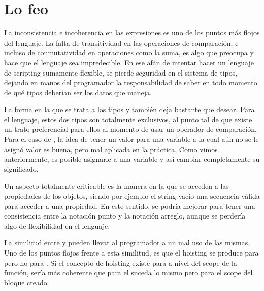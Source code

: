 \section*{Lo feo}

La inconsistencia e incoherencia en las expresiones es uno de los puntos más flojos del lenguaje. La falta de transitividad en las operaciones de comparación, e incluso de conmutatividad en operaciones como la suma, es algo que preocupa y hace que el lenguaje sea impredecible. En ese afán de intentar hacer un lenguaje de scripting sumamente flexible, se pierde seguridad en el sistema de tipos, dejando en manos del programador la responsabilidad de saber en todo momento de qué tipos deberían ser los datos que maneja.

La forma en la que se trata a los tipos  y  también deja bastante que desear. Para el lenguaje, estos dos tipos son totalmente exclusivos, al punto tal de que existe un trato preferencial para ellos al momento de usar un operador de comparación. Para el caso de , la idea de tener un valor para una variable a la cual aún no se le asignó valor es buena, pero mal aplicada en la práctica. Como vimos anteriormente, es posible asignarle  a una variable y así cambiar completamente su significado.

Un aspecto totalmente criticable es la manera en la que se acceden a las propiedades de los objetos, siendo por ejemplo el string vacío una secuencia válida para acceder a una propiedad. En este sentido, se podría mejorar para tener una consistencia entre la notación punto y la notación arreglo, aunque se perdería algo de flexibilidad en el lenguaje.

La similitud entre  y  pueden llevar al programador a un mal uso de las mismas. Uno de los puntos flojos frente a esta similitud, es que el hoisting se produce para  pero no para . Si el concepto de hoisting existe para  a nivel del scope de la función, sería más coherente que para el  suceda lo mismo pero para el scope del bloque creado.

 